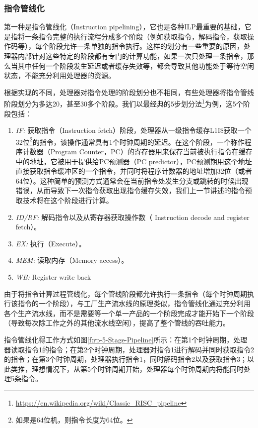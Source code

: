 \subsubsection{指令管线化}
第一种是指令管线化（Instruction pipelining），它也是各种ILP最重要的基础，它是指将一条指令完整的执行流程分成多个阶段（例如获取指令，解码指令，获取操作码等），每个阶段允许一条单独的指令执行。这样的划分有一些重要的原因，处理器内部针对这些特定的阶段都有专门的计算功能，如果一次只处理一条指令，那么当其中任何一个阶段发生延迟或者缓存失效等，都会导致其他功能处于等待空闲状态，不能充分利用处理器的资源。

根据实现的不同，处理器对指令处理的阶段划分也不相同，有些处理器将指令管线阶段划分为多达20，甚至30多个阶段。我们以最经典的5步划分法\footnote{\url{https://en.wikipedia.org/wiki/Classic_RISC_pipeline}}为例，这5个阶段包括：

\begin{enumerate}
	\item \emph{IF: } 获取指令（Instruction fetch）阶段，处理器从一级指令缓存L1I\$获取一个32位\footnote{如果是64位机，则指令长度为64位。}的指令，该操作通常具有1个时钟周期的延迟。在这个阶段，一个称作程序计数器（Program Counter，PC）的寄存器用来保存当前被执行指令在缓存中的地址，它被用于提供给PC预测器（PC predictor），PC预测期用这个地址直接获取指令缓冲区的一个指令，并同时将程序计数器的地址增加32位（或者64位）。这种简单的预测方式通常会在当前指令处发生分支或跳转的时候出现错误，从而导致下一次指令获取出现指令缓存失效，我们上一节讲述的指令预取技术将在这个阶段进行计算。
	
	\item \emph{ID/RF: } 解码指令以及从寄存器获取操作数（ Instruction decode and register fetch）。
	\item \emph{EX: } 执行（Execute）。
	\item \emph{MEM: } 读取内存（Memory access）。
	\item \emph{WB: } Register write back
\end{enumerate}


由于将指令计算过程管线化，每个管线阶段都允许执行一条指令（每个时钟周期执行该指令的一个阶段），与工厂生产流水线的原理类似，指令管线化通过充分利用各个生产流水线，而不是需要等一个单一产品的一个阶段完成才能开始下一个阶段（导致每次除工作之外的其他流水线空闲），提高了整个管线的吞吐能力。

指令管线化得工作方式如图\ref{f:rp-5-Stage-Pipeline}所示：在第1个时钟周期，处理器读取指令1的指令；在第2个时钟周期，处理器对指令1进行解码并同时获取指令2的指令；在第3个时钟周期，处理器执行指令1，同时解码指令2以及获取指令3；以此类推，理想情况下，从第5个时钟周期开始，处理器每个时钟周期内将能同时处理5条指令。

